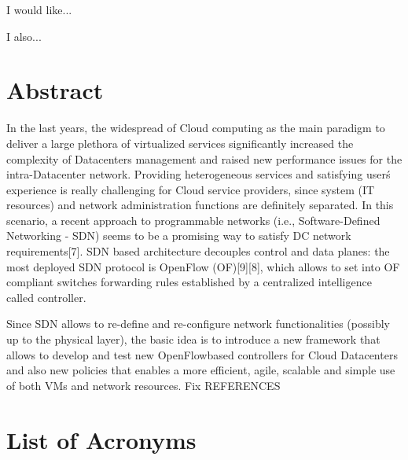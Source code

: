 \documentclass[12pt,english]{book}
\begin{document}

\noindent I would like...

\medskip{}
\noindent I also...

\chapter*{Abstract}


\begin{singlespace}
In the last years, the widespread of Cloud computing as the main paradigm to deliver a large plethora of virtualized services significantly increased the complexity of Datacenters management and raised new performance issues for the intra-Datacenter network.
Providing heterogeneous services and satisfying user\'s experience is really challenging for Cloud service providers, since system (IT resources) and network administration functions are definitely separated. 
In this scenario, a recent approach to programmable networks (i.e., Software-Defined Networking -  SDN) seems to be a promising way to satisfy DC network requirements[7].
SDN based architecture decouples control and data planes: the most deployed SDN protocol is OpenFlow (OF)[9][8], which allows to set into OF compliant switches forwarding rules established by a centralized intelligence called controller. 

Since SDN allows to re-define and re-configure network functionalities (possibly up to the  physical layer), the basic idea is to introduce a new framework that allows to develop and test new OpenFlow\-based controllers for Cloud Datacenters and also new  policies that enables a more efficient, agile, scalable and simple use of both VMs and network resources.
Fix REFERENCES
\end{singlespace}

\newpage

\cleardoublepage

\tableofcontents{}

\cleardoublepage

\chapter*{List of Acronyms}


\end{document}
